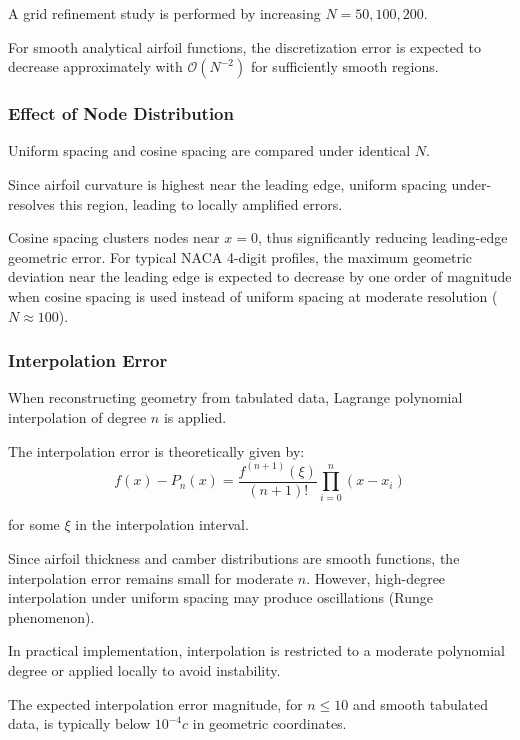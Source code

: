 A grid refinement study is performed by increasing
$N = 50, 100, 200$.

For smooth analytical airfoil functions,
the discretization error is expected to decrease approximately with
$\mathcal{O}(N^{-2})$ for sufficiently smooth regions.


\subsubsection*{Effect of Node Distribution}

Uniform spacing and cosine spacing are compared under identical $N$.

Since airfoil curvature is highest near the leading edge, 
uniform spacing under-resolves this region, 
leading to locally amplified errors.

Cosine spacing clusters nodes near $x=0$, 
thus significantly reducing leading-edge geometric error.
For typical NACA 4-digit profiles, 
the maximum geometric deviation near the leading edge is expected to decrease by one order of magnitude when cosine spacing is used instead of uniform spacing at moderate resolution ($N \approx 100$).


\subsubsection*{Interpolation Error}

When reconstructing geometry from tabulated data, 
Lagrange polynomial interpolation of degree $n$ is applied.

The interpolation error is theoretically given by:
\[
f(x) - P_n(x) =
\frac{f^{(n+1)}(\xi)}{(n+1)!}
\prod_{i=0}^{n}(x - x_i)
\]

for some $\xi$ in the interpolation interval.

Since airfoil thickness and camber distributions are smooth functions, 
the interpolation error remains small for moderate $n$.
However, high-degree interpolation under uniform spacing may produce oscillations (Runge phenomenon).

In practical implementation,
interpolation is restricted to a moderate polynomial degree or applied locally to avoid instability.

The expected interpolation error magnitude,
for $n \leq 10$ and smooth tabulated data,
is typically below $10^{-4}c$ in geometric coordinates.

